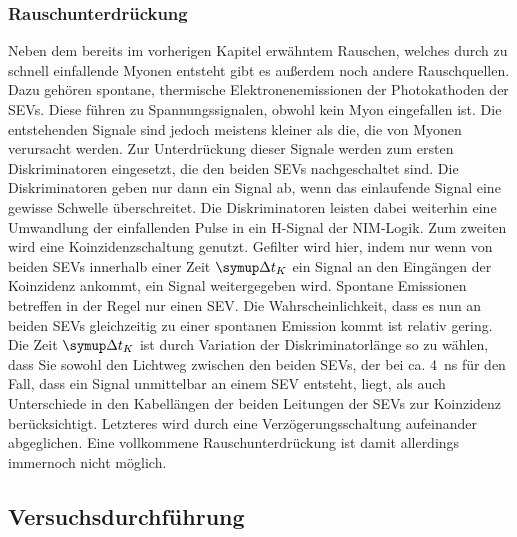 \documentclass[
  bibliography=totoc,     %
  captions=tableheading,  %
  titlepage=firstiscover, %
]{scrartcl}
\begin{document}
  \subsubsection{Rauschunterdrückung}
  \label{Rausch}
  Neben dem bereits im vorherigen Kapitel erwähntem Rauschen, welches durch zu
  schnell einfallende Myonen entsteht gibt es außerdem noch andere Rauschquellen.
  Dazu gehören spontane, thermische Elektronenemissionen der Photokathoden
  der SEVs. Diese führen zu Spannungssignalen, obwohl kein Myon eingefallen ist.
  Die entstehenden Signale sind jedoch meistens kleiner als die, die von Myonen verursacht werden.
  Zur Unterdrückung dieser Signale werden zum ersten Diskriminatoren eingesetzt, die
  den beiden SEVs nachgeschaltet sind. Die Diskriminatoren geben nur dann ein Signal
  ab, wenn das einlaufende Signal eine gewisse Schwelle überschreitet. Die
  Diskriminatoren leisten dabei weiterhin eine Umwandlung der einfallenden Pulse
  in ein H-Signal der NIM-Logik.
  Zum zweiten wird eine Koinzidenzschaltung genutzt. Gefilter wird hier, indem nur
  wenn von beiden SEVs innerhalb einer Zeit $\symup\Delta t_K$
  ein Signal an den Eingängen der Koinzidenz ankommt, ein Signal weitergegeben wird.
  Spontane Emissionen betreffen in der Regel nur einen SEV. Die Wahrscheinlichkeit,
  dass es nun an beiden SEVs gleichzeitig zu einer spontanen Emission kommt ist relativ gering.
  Die Zeit $\symup\Delta t_K$
  ist durch Variation der Diskriminatorlänge so zu wählen, dass Sie sowohl den Lichtweg zwischen den beiden SEVs,
  der bei ca. \SI{4}{\nano\second} für den Fall, dass ein Signal unmittelbar an einem SEV
  entsteht, liegt, als auch Unterschiede in den Kabellängen der beiden Leitungen der
  SEVs zur Koinzidenz berücksichtigt. Letzteres wird durch eine Verzögerungsschaltung
  aufeinander abgeglichen.
  Eine vollkommene Rauschunterdrückung ist damit allerdings immernoch nicht
  möglich.
  \subsection{Versuchsdurchführung}
  \label{sec:Durchführung}
\end{document}
